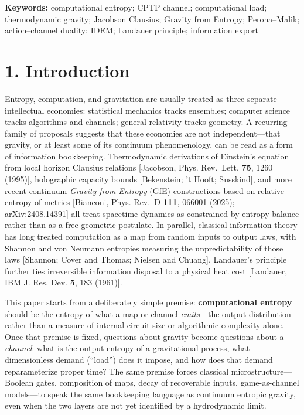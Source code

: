 \documentclass[
  11pt,
]{article}
\begin{document}
\textbf{Keywords:} computational entropy; CPTP channel; computational
load; thermodynamic gravity; Jacobson Clausius; Gravity from Entropy;
Perona--Malik; action--channel duality; IDEM; Landauer principle;
information export

\section{1. Introduction}\label{introduction}

Entropy, computation, and gravitation are usually treated as three
separate intellectual economies: statistical mechanics tracks ensembles;
computer science tracks algorithms and channels; general relativity
tracks geometry. A recurring family of proposals suggests that these
economies are not independent---that gravity, or at least some of its
continuum phenomenology, can be read as a form of information
bookkeeping. Thermodynamic derivations of Einstein's equation from local
horizon Clausius relations [Jacobson, Phys. Rev.~Lett. \textbf{75},
1260 (1995)], holographic capacity bounds [Bekenstein; 't Hooft;
Susskind], and more recent continuum \emph{Gravity-from-Entropy} (GfE)
constructions based on relative entropy of metrics [Bianconi, Phys.
Rev.~D \textbf{111}, 066001 (2025); arXiv:2408.14391] all treat
spacetime dynamics as constrained by entropy balance rather than as a
free geometric postulate. In parallel, classical information theory has
long treated computation as a map from random inputs to output laws,
with Shannon and von Neumann entropies measuring the unpredictability of
those laws [Shannon; Cover and Thomas; Nielsen and Chuang].
Landauer's principle further ties irreversible information disposal to a
physical heat cost [Landauer, IBM J. Res. Dev. \textbf{5}, 183
(1961)].

This paper starts from a deliberately simple premise:
\textbf{computational entropy} should be the entropy of what a map or
channel \emph{emits}---the output distribution---rather than a measure
of internal circuit size or algorithmic complexity alone. Once that
premise is fixed, questions about gravity become questions about a
\emph{channel}: what is the output entropy of a gravitational process,
what dimensionless demand (``load'') does it impose, and how does that
demand reparameterize proper time? The same premise forces classical
microstructure---Boolean gates, composition of maps, decay of
recoverable inputs, game-as-channel models---to speak the same
bookkeeping language as continuum entropic gravity, even when the two
layers are not yet identified by a hydrodynamic limit.
\end{document}
